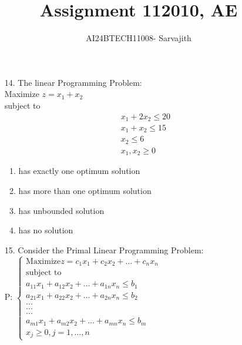 \documentclass[journal]{IEEEtran}
\begin{document}

\vspace{3cm}


\author{AI24BTECH11008- Sarvajith
}
\title{Assignment 11}
{\let\newpage\relax\maketitle}
\title{2010, AE}
\renewcommand{\thefigure}{\theenumi}
\renewcommand{\thetable}{\theenumi}
\setlength{\intextsep}{10pt} %
\renewcommand{\thetable}{\theenumi}
\begin{enumerate}
    \item[14.] The linear Programming Problem:\\Maximize $z=x_1+x_2$\\subject to
    \begin{align*}
     x_1 + 2x_2 \leq 20\\
     x_1 + x_2 \leq 15\\
     x_2\leq 6\\
     x_1, x_2 \geq 0
    \end{align*}
    \begin{enumerate}[label=(\Alph*)]
        \item has exactly one optimum solution
        \item has more than one optimum solution
        \item has unbounded solution
        \item has no solution
    \end{enumerate}
    \item[15.] Consider the Primal Linear Programming Problem:\\
    P: $\begin{cases} \text{Maximize} z = c_1x_1+c_2x_2+\ldots+c_nx_n\\\text{subject to}\\a_{11}x_1+a_{12}x_2+\ldots+a_{1n}x_n \leq b_1\\a_{21}x_1+a_{22}x_2+\ldots+a_{2n}x_n \leq b_2\\.      .      .\\.      .      .\\.      .      .\\a_{m1}x_1+a_{m2}x_2+\ldots+a_{mn}x_n \leq b_m\\ x_j \geq 0, j=1,\ldots,n\end{cases}$

\end{enumerate}
\end{document}
